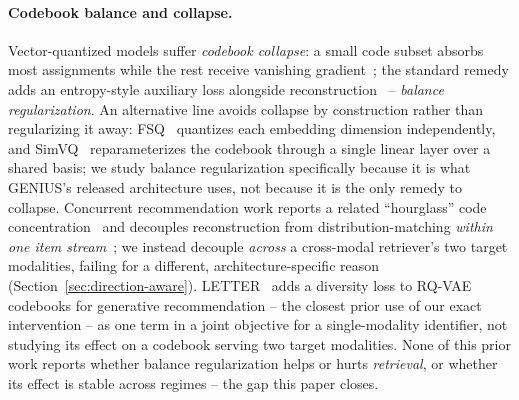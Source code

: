 \paragraph{Codebook balance and collapse.} Vector-quantized models suffer \emph{codebook collapse}: a small code subset absorbs most assignments while the rest receive vanishing gradient~\cite{vandenoord2017vqvae}; the standard remedy adds an entropy-style auxiliary loss alongside reconstruction~\cite{zhang2023regularizedvq} -- \emph{balance regularization}. An alternative line avoids collapse by construction rather than regularizing it away: FSQ~\cite{mentzer2024fsq} quantizes each embedding dimension independently, and SimVQ~\cite{zhu2024simvq} reparameterizes the codebook through a single linear layer over a shared basis; we study balance regularization specifically because it is what GENIUS's released architecture uses, not because it is the only remedy to collapse. Concurrent recommendation work reports a related ``hourglass'' code concentration~\cite{kuai2024hourglass} and decouples reconstruction from distribution-matching \emph{within one item stream}~\cite{wang2026decoupledrq}; we instead decouple \emph{across} a cross-modal retriever's two target modalities, failing for a different, architecture-specific reason (Section~\ref{sec:direction-aware}). LETTER~\cite{wang2024letter} adds a diversity loss to RQ-VAE codebooks for generative recommendation -- the closest prior use of our exact intervention -- as one term in a joint objective for a single-modality identifier, not studying its effect on a codebook serving two target modalities. None of this prior work reports whether balance regularization helps or hurts \emph{retrieval}, or whether its effect is stable across regimes -- the gap this paper closes.
